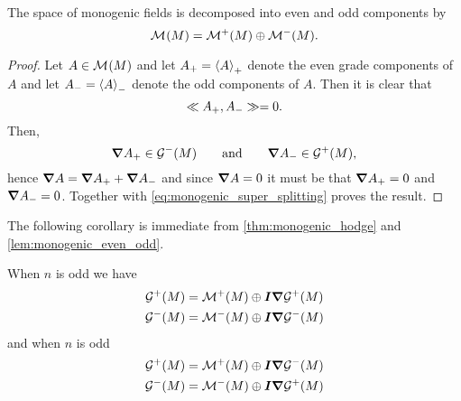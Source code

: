 \begin{lemma}
\label{lem:monogenic_even_odd}
The space of monogenic fields is decomposed into even and odd components by
\begin{equation}
    \monogenicfields{} = \monogenicfields{+} \oplus \monogenicfields{-}.
\end{equation}
\end{lemma}
\begin{proof}
Let $A \in \monogenicfields{}$ and let $A_+=\proj{+}{A}$ denote the even grade components of $A$ and let $A_-=\proj{-}{A}$ denote the odd components of $A$. Then it is clear that 
\begin{equation}
\label{eq:monogenic_super_splitting}
\multivecinnerproduct{A_+}{A_-} = 0.
\end{equation}
Then,
\begin{equation}
\grad A_+ \in \G^-(M) \qquad \textrm{and} \qquad \grad A_- \in \G^+(M),
\end{equation}
hence $\grad A = \grad A_+ + \grad A_-$ and since $\grad A=0$ it must be that $\grad A_+=0$ and $\grad A_-=0$. Together with \cref{eq:monogenic_super_splitting} proves the result.
\end{proof}

The following corollary is immediate from \cref{thm:monogenic_hodge} and \cref{lem:monogenic_even_odd}.
\begin{corollary}
When $n$ is odd we have
\begin{align}
\G^+(M) &= \monogenicfields{+} \oplus \pseudoscalar \grad \G^+(M)\\
\G^-(M) &= \monogenicfields{-} \oplus \pseudoscalar \grad \G^-(M)\\
\end{align}
and when $n$ is odd
\begin{align}
\G^+(M) &= \monogenicfields{+} \oplus \pseudoscalar \grad \G^-(M)\\
\G^-(M) &= \monogenicfields{-} \oplus \pseudoscalar \grad \G^+(M)\\
\end{align}
\end{corollary}



